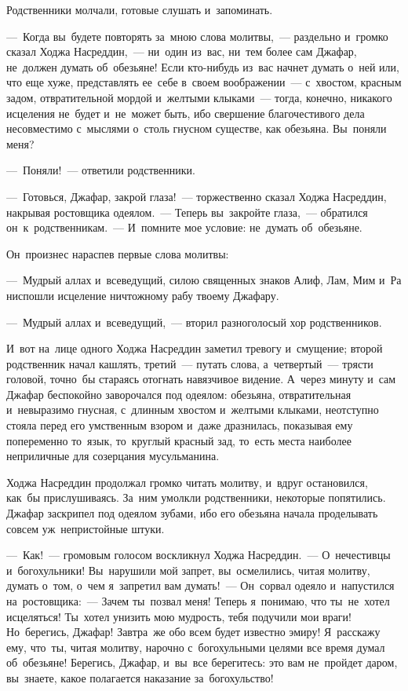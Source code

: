 \documentclass[12pt,a4paper]{book}
\begin{document}
Родственники молчали, готовые слушать и~запоминать.

—~Когда вы~будете повторять за~мною слова молитвы,~— раздельно и~громко сказал Ходжа Насреддин,~— ни~один из~вас, ни~тем более сам Джафар, не~должен думать об~обезьяне! Если кто-нибудь из~вас начнет думать о~ней или, что еще хуже, представлять ее~себе в~своем воображении~— с~хвостом, красным задом, отвратительной мордой и~желтыми клыками~— тогда, конечно, никакого исцеления не~будет и~не~может быть, ибо свершение благочестивого дела несовместимо с~мыслями о~столь гнусном существе, как обезьяна. Вы~поняли меня?

—~Поняли!~— ответили родственники.

—~Готовься, Джафар, закрой глаза!~— торжественно сказал Ходжа Насреддин, накрывая ростовщика одеялом.~— Теперь вы~закройте глаза,~— обратился он~к~родственникам.~— И~помните мое условие: не~думать об~обезьяне.

Он~произнес нараспев первые слова молитвы:

—~Мудрый аллах и~всеведущий, силою священных знаков Алиф, Лам, Мим и~Ра ниспошли исцеление ничтожному рабу твоему Джафару.

—~Мудрый аллах и~всеведущий,~— вторил разноголосый хор родственников.

И~вот на~лице одного Ходжа Насреддин заметил тревогу и~смущение; второй родственник начал кашлять, третий~— путать слова, а~четвертый~— трясти головой, точно~бы стараясь отогнать навязчивое видение. А~через минуту и~сам Джафар беспокойно заворочался под одеялом: обезьяна, отвратительная и~невыразимо гнусная, с~длинным хвостом и~желтыми клыками, неотступно стояла перед его умственным взором и~даже дразнилась, показывая ему попеременно то~язык, то~круглый красный зад, то~есть места наиболее неприличные для созерцания мусульманина.

Ходжа Насреддин продолжал громко читать молитву, и~вдруг остановился, как~бы прислушиваясь. За~ним умолкли родственники, некоторые попятились. Джафар заскрипел под одеялом зубами, ибо его обезьяна начала проделывать совсем уж~непристойные штуки.

—~Как!~— громовым голосом воскликнул Ходжа Насреддин.~— О~нечестивцы и~богохульники! Вы~нарушили мой запрет, вы~осмелились, читая молитву, думать о~том, о~чем я~запретил вам думать!~— Он~сорвал одеяло и~напустился на~ростовщика:~— Зачем ты~позвал меня! Теперь я~понимаю, что ты~не~хотел исцеляться! Ты~хотел унизить мою мудрость, тебя подучили мои враги! Но~берегись, Джафар! Завтра~же обо всем будет известно эмиру! Я~расскажу ему, что~ты, читая молитву, нарочно с~богохульными целями все время думал об~обезьяне! Берегись, Джафар, и~вы~все берегитесь: это вам не~пройдет даром, вы~знаете, какое полагается наказание за~богохульство!
\end{document}
